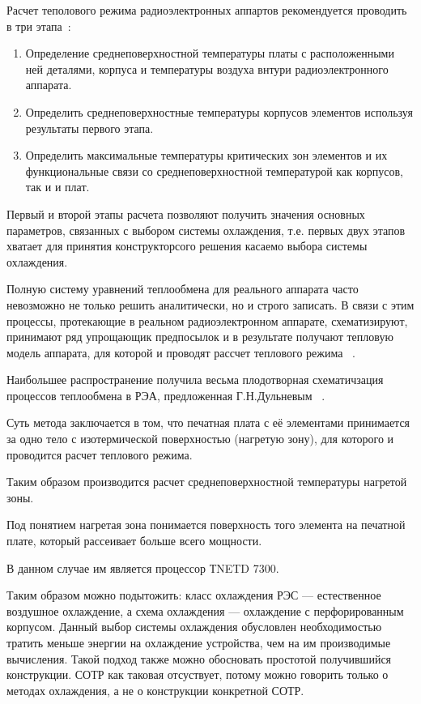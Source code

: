 Расчет теполового режима радиоэлектронных аппартов рекомендуется
проводить в три этапа~\cite{Rotkop1976}:
\begin{enumerate}[label={\arabic*.}]
  \item Определение среднеповерхностной температуры платы с
расположенными ней деталями, корпуса и температуры воздуха внтури
радиоэлектронного аппарата.
  \item Определить среднеповерхностные температуры корпусов элементов
  используя результаты первого этапа.
  \item Определить максимальные температуры критических зон элементов и
их функциональные связи со среднеповерхностной температурой как
корпусов, так и и плат.
\end{enumerate}

Первый и второй этапы расчета позволяют получить значения основных
параметров, связанных с выбором системы охлаждения, т.е. первых двух
этапов хватает для принятия конструкторсого решения касаемо выбора
системы охлаждения.

Полную систему уравнений теплообмена для реального аппарата часто
невозможно не только решить аналитически, но и строго записать. В
связи с этим процессы, протекающие в реальном радиоэлектронном
аппарате, схематизируют, принимают ряд упрощающик предпосылок и в
результате получают тепловую модель аппарата, для которой и проводят
рассчет теплового режима ~\cite{Rotkop1976}.

Наибольшее распространение получила весьма плодотворная схематичзация
процессов теплообмена в РЭА, предложенная Г.Н.Дульневым
~\cite{Dulnev1968}.

Суть метода заключается в том, что печатная плата с её элементами
принимается за одно тело с изотермической поверхностью (нагретую
зону), для которого и проводится расчет теплового режима.

Таким образом производится расчет среднеповерхностной температуры
нагретой зоны.

Под понятием нагретая зона понимается поверхность того элемента на
печатной плате, который рассеивает больше всего мощности.

В данном случае им является процессор ТNETD 7300.


Таким образом можно подытожить: класс охлаждения РЭС — естественное
воздушное охлаждение, а схема охлаждения — охлаждение с
перфорированным корпусом. Данный выбор системы охлаждения обусловлен
необходимостью тратить меньше энергии на охлаждение устройства, чем на
им производимые вычисления. Такой подход также можно обосновать
простотой получившийся конструкции. СОТР как таковая отсуствует,
потому можно говорить только о методах охлаждения, а не о конструкции
конкретной СОТР.

\newpage
